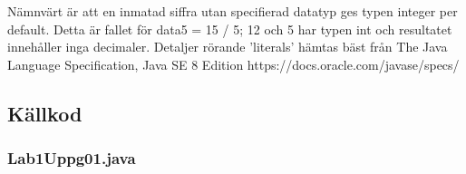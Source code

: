 \par Nämnvärt är att en inmatad siffra utan specifierad datatyp ges typen integer
per default. Detta är fallet för data5 = 15 / 5; 12 och 5 har typen int och
resultatet innehåller inga decimaler.
Detaljer rörande 'literals' hämtas bäst från
The Java Language Specification, Java SE 8 Edition
https://docs.oracle.com/javase/specs/



\subsection{Källkod}\label{subsection-1}
\subsubsection*{Lab1Uppg01.java}
\inputminted[]{java}{src/Lab1Uppg01.java}
